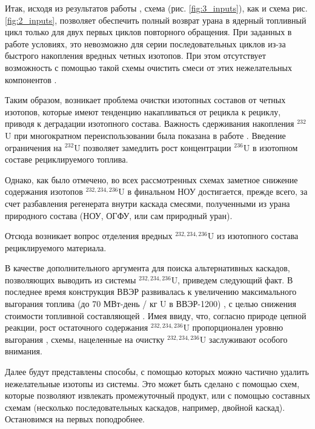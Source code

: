 Итак, исходя из результатов работы \cite{smirnovApplyingEnrichmentCapacities2018}, схема (рис. \ref{fig:3_inputs}), как и схема рис. \ref{fig:2_inputs}, позволяет обеспечить полный возврат урана в ядерный топливный цикл только для двух первых циклов повторного обращения.
При заданных в работе \cite{smirnovApplyingEnrichmentCapacities2018} условиях, это невозможно для серии последовательных циклов из-за быстрого накопления вредных четных изотопов. При  этом отсутствует возможность с помощью такой схемы очистить смеси от этих нежелательных компонентов \cite{smirnovApplyingEnrichmentCapacities2018}.

Таким образом, возникает проблема очистки изотопных составов от четных изотопов, которые имеют тенденцию накапливаться от рецикла к рециклу, приводя к деградации изотопного состава.
Важность сдерживания накопления $^{232}$U при многократном переиспользовании была показана в работе \cite{smirnovEvolutionIsotopicComposition2012}.
Введение ограничения на $^{232}$U позволяет замедлить рост концентрации $^{236}$U в изотопном составе рециклируемого топлива.

Однако, как было отмечено, во всех рассмотренных схемах заметное снижение содержания изотопов $^{232,234,236}$U в финальном НОУ достигается, прежде всего, за счет разбавления регенерата внутри каскада смесями, полученными из урана природного состава (НОУ, ОГФУ, или сам природный уран).

Отсюда возникает вопрос отделения вредных $^{232,234,236}$U из изотопного состава рециклируемого материала.

В качестве дополнительного аргумента для поиска альтернативных каскадов, позволяющих выводить из системы $^{232,234,236}$U, приведем следующий факт.
В последнее время конструкция ВВЭР развивалась к увеличению максимального выгорания топлива (до 70 МВт-день / кг U в ВВЭР-1200) \cite{asmolovNewGenerationFirstofthe2017}, с целью снижения стоимости топливной составляющей \cite{andrianovaPovyshenievygoraniyaToplivaVVER2008}.
Имея ввиду, что, согласно природе цепной реакции, рост остаточного содержания $^{232,234,236}$U пропорционален уровню выгорания \cite{VeryHighBurnups2006}, схемы, нацеленные на очистку $^{232,234,236}$U заслуживают особого внимания.

Далее будут представлены способы, с помощью которых можно частично удалить нежелательные изотопы из системы. Это может быть сделано с помощью схем, которые позволяют извлекать промежуточный продукт, или с помощью составных схемам (несколько последовательных каскадов, например, двойной каскад). Остановимся на первых поподробнее.

